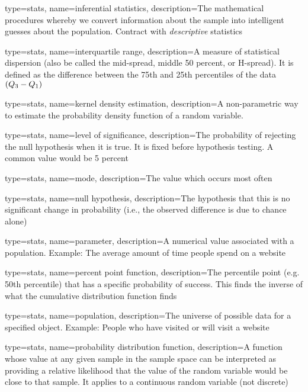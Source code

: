 {
	type=stats,
    name=inferential statistics,
    description={The mathematical procedures whereby we convert information about the sample into intelligent guesses about the population.  Contract with \textit{descriptive} statistics}
}

{
	type=stats,
    name=interquartile range,
    description={A measure of statistical dispersion (also be called the mid-spread, middle 50 percent, or H-spread).  It is defined as the difference between the 75th and 25th percentiles of the data $\left(\mbox{$Q_{3}$}{}-\mbox{$Q_{1}$}{}\right)$}
}

{
	type=stats,
    name=kernel density estimation,
    description={A non-parametric way to estimate the probability density function of a random variable.}
}

{
	type=stats,
    name=level of significance,
    description={The probability of rejecting the null hypothesis when it is true.  It is fixed before hypothesis testing.  A common value would be 5 percent}
}

{
	type=stats,
    name=mode,
    description={The value which occurs most often}
}

{
	type=stats,
    name=null hypothesis,
    description={The hypothesis that this is no significant change in probability (i.e., the observed difference is due to chance alone)}
}

{
	type=stats,
    name=parameter,
    description={A numerical value associated with a population. Example: The average amount of time people spend on a website}
}

{
	type=stats,
    name=percent point function,
    description={The percentile point (e.g. 50th percentile) that has a specific probability of success.  This finds the inverse of what the cumulative distribution function finds}
}

{
	type=stats,
    name=population,
    description={The universe of possible data for a specified object. Example: People who have visited or will visit a website}
}

{
	type=stats,
    name=probability distribution function,
    description={A function whose value at any given sample in the sample space can be interpreted as providing a relative likelihood that the value of the random variable would be close to that sample.  It applies to a continuous random variable (not discrete)}
}

